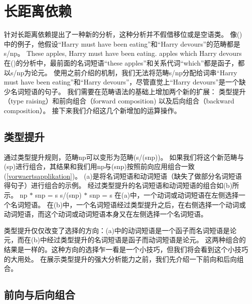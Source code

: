 \section{长距离依赖}
\label{Abschnitt-UDC-KG}\label{sce-nld-cg}

\mbox{}\citet[Section~1.2.4]{Steedman89a}针对长距离依赖提出了一种新的分析，这种分析并不假借移位或是空语类。
像()中的例子，他假设``{Harry must have been eating}''和``{Harry devours}''的范畴都是s/np。
\eal
\ex\label{Bsp-these-apples}
These apples, Harry must have been eating.
\ex apples which Harry devours
\zl
在()的分析中，最前面的名词短语``{these apples}''和关系代词``{which}''都是函子，都以s/np为论元。
使用之前介绍的机制，我们无法将范畴s/np分配给词串``{Harry must have been eating}''和``{Harry devours}''，尽管直觉上``{Harry devours}''是一个缺少名词短语的句子。
我们需要在范畴语法的基础上增加两个新的扩展：
类型提升（type raising）和前向组合（forward composition)
以及后向组合（backward composition）。
接下来我们介绍这几个新增加的运算操作。

\subsection{类型提升}

\addlines[-1]
通过类型提升规则，范畴np可以变形为范畴(s/(s\bs np))。
如果我们将这个新范畴与(s\bs p)进行组合，其结果和我们用np与(s\bs np)按照前向应用组合一致(\ref{vorwaertsapplikation})。 
(a)是将名词短语和动词短语（缺失了做部分名词短语得句子）进行组合的示例。
经过类型提升的名词短语和动词短语的组合如(b)所示。
\eal
\ex np $*$ s\bs np = s 
\ex s/(s\bs np) $*$ s\bs np = s
\zl
在(a)中，一个动词或动词短语在左侧选择一个名词短语。
在(b)中，一个名词短语经过类型提升之后，在右侧选择一个动词或动词短语，而这个动词或动词短语本身又在左侧选择一个名词短语。

类型提升仅仅改变了选择的方向：(a)中的动词短语是一个函子而名词短语是论元，而在(b)中经过类型提升的名词短语是函子而动词短语是论元。
这两种组合的结果是一样的。这种方向的选择乍一看是一个小技巧，但我们将会看到这个小技巧的大用处。
在展示类型提升的强大分析能力之前，我们先介绍一下前向和后向组合。

\subsection{前向与后向组合}
\label{Kategorialgrammatik-Komposition}

